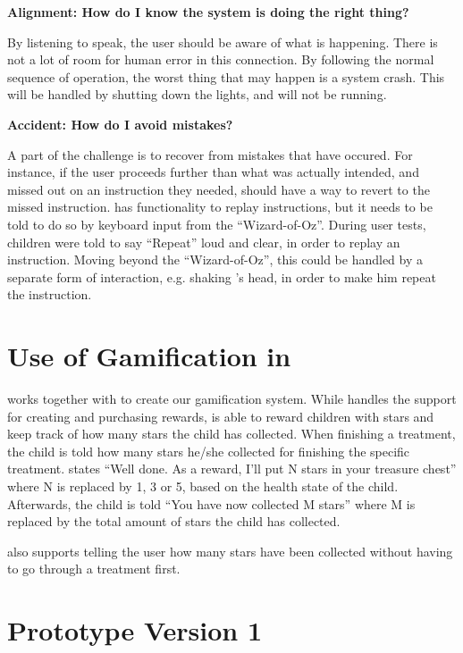\textbf{Alignment: How do I know the system is doing the right thing?}

By listening to \buddy{} speak, the user should be aware of what is happening. There is not a lot of room for human error in this connection. By following the normal sequence of operation, the worst thing that may happen is a system crash. This will be handled by shutting down the lights, and \buddy{} will not be running.  

\textbf{Accident: How do I avoid mistakes?}

A part of the challenge is to recover from mistakes that have occured. For instance, if the user proceeds further than what was actually intended, and missed out on an instruction they needed, \buddy{} should have a way to revert to the missed instruction. \ab{} has functionality to replay instructions, but it needs to be told to do so by keyboard input from the ``Wizard-of-Oz''. During user tests, children were told to say ``Repeat'' loud and clear, in order to replay an instruction. Moving beyond the ``Wizard-of-Oz'', this could be handled by a separate form of interaction, e.g. shaking \ab{}'s head, in order to make him repeat the instruction.      
\section{Use of Gamification in \ab{}}
\label{sec:useofgamificationinab}
\ab{} works together with \app{} to create our gamification system. While \app{} handles the support for creating and purchasing rewards, \ab{} is able to reward children with stars and keep track of how many stars the child has collected. 
When finishing a treatment, the child is told how many stars he/she collected for finishing the specific treatment. \ab{} states ``Well done. As a reward, I'll put N stars in your treasure chest'' where N is replaced by  1, 3 or 5, based on the health state of the child. Afterwards, the child is told ``You have now collected M stars'' where M is replaced by the total amount of stars the child has collected. 

\ab{} also supports telling the user how many stars have been collected without having to go through a treatment first.



 

\section{Prototype Version 1}
\label{sec:proto1}

